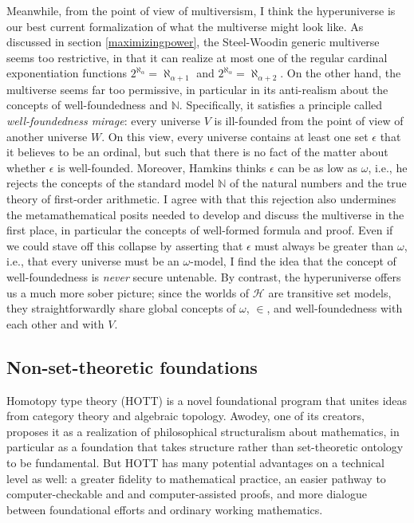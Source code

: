 \documentclass[letterpaper,12pt]{article}
\newcommand{\N}{\mathbb{N}}
\begin{document}
Meanwhile, from the point of view of multiversism, I think the hyperuniverse is our best current formalization of what the multiverse might look like. As discussed in section \ref{maximizingpower}, the Steel-Woodin generic multiverse seems too restrictive, in that it can realize at most one of the regular cardinal exponentiation functions $2^{\aleph_\alpha} = \aleph_{\alpha + 1}$ and $2^{\aleph_\alpha} = \aleph_{\alpha + 2}$. On the other hand, the \cite{hamkins2012set} multiverse seems far too permissive, in particular in its anti-realism about the concepts of well-foundedness and $\mathbb{N}$. Specifically, it satisfies a principle called \emph{well-foundedness mirage}: every universe $V$ is ill-founded from the point of view of another universe $W$. On this view, every universe contains at least one set $\epsilon$ that it believes to be an ordinal, but such that there is no fact of the matter about whether $\epsilon$ is well-founded. Moreover, Hamkins thinks $\epsilon$ can be as low as $\omega$, i.e., he rejects the concepts of the standard model $\N$ of the natural numbers and the true theory of first-order arithmetic. I agree with \cite{barton2016multiversism} that this rejection also undermines the metamathematical posits needed to develop and discuss the multiverse in the first place, in particular the concepts of well-formed formula and proof. Even if we could stave off this collapse by asserting that $\epsilon$ must always be greater than $\omega$, i.e., that every universe must be an $\omega$-model, I find the idea that the concept of well-foundedness is \emph{never} secure untenable. By contrast, the hyperuniverse offers us a much more sober picture; since the worlds of $\mathcal{H}$ are transitive set models, they straightforwardly share global concepts of $\omega$, $\in$, and well-foundedness with each other and with $V$.

\subsection{Non-set-theoretic foundations}
\label{alternatefoundations}
Homotopy type theory (HOTT) is a novel foundational program that unites ideas from category theory and algebraic topology. Awodey, one of its creators, proposes it \citeyearpar{awodey2014structuralism} as a realization of philosophical structuralism about mathematics, in particular as a foundation that takes structure rather than set-theoretic ontology to be fundamental. But HOTT has many potential advantages on a technical level as well: a greater fidelity to mathematical practice, an easier pathway to computer-checkable and and computer-assisted proofs, and more dialogue between foundational efforts and ordinary working mathematics.
\end{document}
